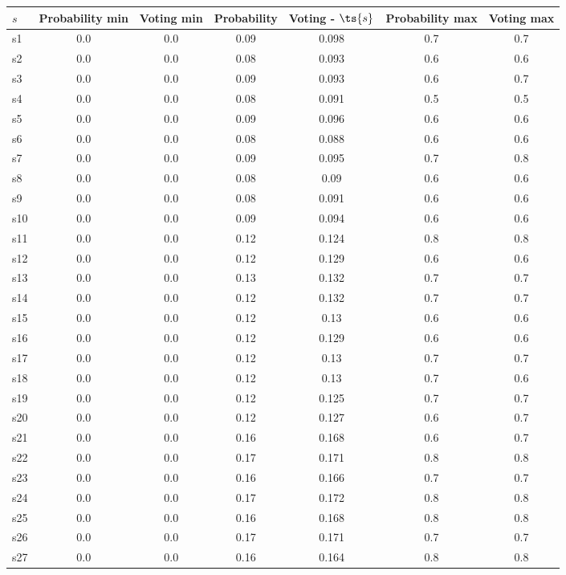 \documentclass{article}
\begin{document}
\noindent\begin{tabular}{|l|c|c|c|c|c|c|}
\hline
$s$& Probability min & Voting min & Probability & Voting - $\ts{s}$ & Probability max & Voting max\\
\hline
s1 &0.0 & 0.0 & 0.09 & 0.098 & 0.7 & 0.7\\
\hline
s2 &0.0 & 0.0 & 0.08 & 0.093 & 0.6 & 0.6\\
\hline
s3 &0.0 & 0.0 & 0.09 & 0.093 & 0.6 & 0.7\\
\hline
s4 &0.0 & 0.0 & 0.08 & 0.091 & 0.5 & 0.5\\
\hline
s5 &0.0 & 0.0 & 0.09 & 0.096 & 0.6 & 0.6\\
\hline
s6 &0.0 & 0.0 & 0.08 & 0.088 & 0.6 & 0.6\\
\hline
s7 &0.0 & 0.0 & 0.09 & 0.095 & 0.7 & 0.8\\
\hline
s8 &0.0 & 0.0 & 0.08 & 0.09 & 0.6 & 0.6\\
\hline
s9 &0.0 & 0.0 & 0.08 & 0.091 & 0.6 & 0.6\\
\hline
s10 &0.0 & 0.0 & 0.09 & 0.094 & 0.6 & 0.6\\
\hline
s11 &0.0 & 0.0 & 0.12 & 0.124 & 0.8 & 0.8\\
\hline
s12 &0.0 & 0.0 & 0.12 & 0.129 & 0.6 & 0.6\\
\hline
s13 &0.0 & 0.0 & 0.13 & 0.132 & 0.7 & 0.7\\
\hline
s14 &0.0 & 0.0 & 0.12 & 0.132 & 0.7 & 0.7\\
\hline
s15 &0.0 & 0.0 & 0.12 & 0.13 & 0.6 & 0.6\\
\hline
s16 &0.0 & 0.0 & 0.12 & 0.129 & 0.6 & 0.6\\
\hline
s17 &0.0 & 0.0 & 0.12 & 0.13 & 0.7 & 0.7\\
\hline
s18 &0.0 & 0.0 & 0.12 & 0.13 & 0.7 & 0.6\\
\hline
s19 &0.0 & 0.0 & 0.12 & 0.125 & 0.7 & 0.7\\
\hline
s20 &0.0 & 0.0 & 0.12 & 0.127 & 0.6 & 0.7\\
\hline
s21 &0.0 & 0.0 & 0.16 & 0.168 & 0.6 & 0.7\\
\hline
s22 &0.0 & 0.0 & 0.17 & 0.171 & 0.8 & 0.8\\
\hline
s23 &0.0 & 0.0 & 0.16 & 0.166 & 0.7 & 0.7\\
\hline
s24 &0.0 & 0.0 & 0.17 & 0.172 & 0.8 & 0.8\\
\hline
s25 &0.0 & 0.0 & 0.16 & 0.168 & 0.8 & 0.8\\
\hline
s26 &0.0 & 0.0 & 0.17 & 0.171 & 0.7 & 0.7\\
\hline
s27 &0.0 & 0.0 & 0.16 & 0.164 & 0.8 & 0.8\\

\end{tabular}
\end{document}
